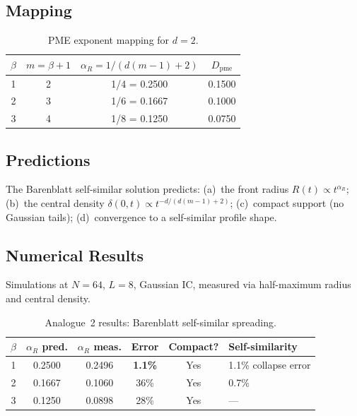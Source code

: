 \documentclass[11pt]{article}
\begin{document}
\subsection{Mapping}

\begin{table}[h]
\centering
\begin{tabular}{@{}cccc@{}}
\toprule
\(\beta\) & \(m = \beta+1\) & \(\alpha_R = 1/(d(m-1)+2)\) & \(D_{\mathrm{pme}}\) \\
\midrule
1 & 2 & 1/4 = 0.2500 & 0.1500 \\
2 & 3 & 1/6 = 0.1667 & 0.1000 \\
3 & 4 & 1/8 = 0.1250 & 0.0750 \\
\bottomrule
\end{tabular}
\caption{PME exponent mapping for \(d=2\).}
\label{tab:pme-map}
\end{table}

\subsection{Predictions}

The Barenblatt self-similar solution predicts: (a)~the front radius \(R(t) \propto t^{\alpha_R}\); (b)~the central density \(\delta(0,t) \propto t^{-d/(d(m-1)+2)}\); (c)~compact support (no Gaussian tails); (d)~convergence to a self-similar profile shape.

\subsection{Numerical Results}

Simulations at \(N = 64\), \(L = 8\), Gaussian IC, measured via half-maximum radius and central density.

\begin{table}[h]
\centering
\begin{tabular}{@{}cccccl@{}}
\toprule
\(\beta\) & \(\alpha_R\) pred. & \(\alpha_R\) meas. & Error & Compact? & Self-similarity \\
\midrule
1 & 0.2500 & 0.2496 & \textbf{1.1\%} & Yes & 1.1\% collapse error \\
2 & 0.1667 & 0.1060 & 36\% & Yes & 0.7\% \\
3 & 0.1250 & 0.0898 & 28\% & Yes & --- \\
\bottomrule
\end{tabular}
\caption{Analogue~2 results: Barenblatt self-similar spreading.}
\label{tab:baren-results}
\end{table}
\end{document}
